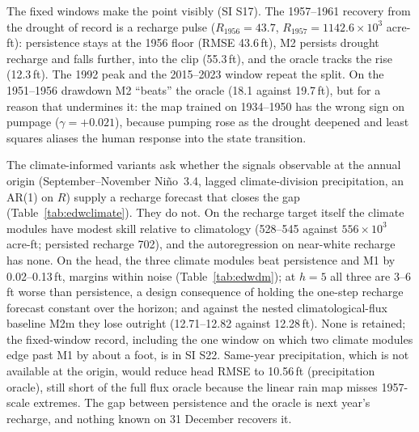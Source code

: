 The fixed windows make the point visibly (SI S17). The 1957--1961 recovery from the drought of record is a recharge pulse ($R_{1956}=43.7$, $R_{1957}=1142.6\times10^3$ acre-ft): persistence stays at the 1956 floor (RMSE 43.6\,ft), M2 persists drought recharge and falls further, into the clip (55.3\,ft), and the oracle tracks the rise (12.3\,ft). The 1992 peak and the 2015--2023 window repeat the split. On the 1951--1956 drawdown M2 ``beats'' the oracle (18.1 against 19.7\,ft), but for a reason that undermines it: the map trained on 1934--1950 has the wrong sign on pumpage ($\gamma=+0.021$), because pumping rose as the drought deepened and least squares aliases the human response into the state transition.

The climate-informed variants ask whether the signals observable at the annual origin (September--November Ni\~no~3.4, lagged climate-division precipitation, an AR(1) on $R$) supply a recharge forecast that closes the gap (Table~\ref{tab:edwclimate}). They do not. On the recharge target itself the climate modules have modest skill relative to climatology (528--545 against $556\times10^3$ acre-ft; persisted recharge 702), and the autoregression on near-white recharge has none. On the head, the three climate modules beat persistence and M1 by 0.02--0.13\,ft, margins within noise (Table~\ref{tab:edwdm}); at $h=5$ all three are 3--6\,ft worse than persistence, a design consequence of holding the one-step recharge forecast constant over the horizon; and against the nested climatological-flux baseline M2m they lose outright (12.71--12.82 against 12.28\,ft). None is retained; the fixed-window record, including the one window on which two climate modules edge past M1 by about a foot, is in SI S22. Same-year precipitation, which is not available at the origin, would reduce head RMSE to 10.56\,ft (precipitation oracle), still short of the full flux oracle because the linear rain map misses 1957-scale extremes. The gap between persistence and the oracle is next year's recharge, and nothing known on 31 December recovers it.

